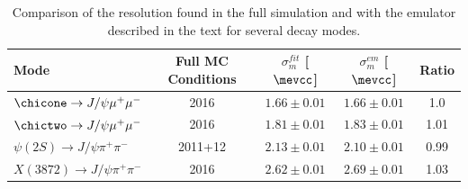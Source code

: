 \begin{table}[htb!]
\caption{\small Comparison of the resolution found in the full
  simulation and with the emulator described in the text for several
  decay modes. }
\begin{center}
\small
\begin{tabular}{l|c|c|c|c}
Mode & Full MC Conditions & $\sigma^{fit}_m$ [$\mevcc$] &
                                                          $\sigma^{em}_m$
                                                          [$\mevcc$] &
  Ratio\\ \hline
$\chicone \rightarrow J/\psi \mu^+ \mu^-$  & 2016 & $1.66 \pm 0.01$ &
                                                                      $1.66
                                                                      \pm
                                                                      0.01$
                                                                     &
  1.0\\
$\chictwo \rightarrow J/\psi \mu^+ \mu^-$  & 2016 & $1.81 \pm 0.01$ &
                                                                      $1.83
                                                                      \pm
                                                                      0.01$
                                                                     &
  1.01\\
$\psi(2S) \rightarrow J/\psi \pi^+ \pi^-$  & 2011+12 & $2.13 \pm 0.01$
                                                        &  $2.10 \pm
                                                          0.01$ & 0.99
  \\
$X(3872) \rightarrow J/\psi \pi^+ \pi^-$  & 2016 &$2.62 \pm 0.01$ &
                                                                    $2.69
                                                                    \pm
                                                                    0.01$
                                                                     &
  1.03\\
\end{tabular}
\end{center}
\label{tab:valid}
\end{table} 



